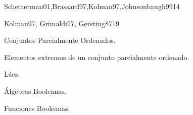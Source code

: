 \begin{syllabus}
\begin{unit}{\DSTHREEDef}{Scheinerman01,Brassard97,Kolman97,Johnsonbaugh99}{14}
\begin{topics}
      \item \DSTHREETopicNociones
      \item \DSTHREETopicEstructura
      \item \DSTHREETopicPruebas
      \item \DSTHREETopicPruebasy
      \item \DSTHREETopicPruebaspor
      \item \DSTHREETopicPruebasporcontradiccion
      \item \DSTHREETopicInduccion
      \item \DSTHREETopicInduccionfuerte
      \item \DSTHREETopicDefiniciones
      \item \DSTHREETopicEl
   \end{topics}

   \begin{unitgoals}
      \item \DSTHREEObjONE
      \item \DSTHREEObjTWO
      \item \DSTHREEObjTHREE
      \item \DSTHREEObjFOUR
   \end{unitgoals}
\end{unit}

\begin{unit}{\ARONEDef}{Kolman97, Grimaldi97, Gersting87}{19}
\begin{topics}
      \item Conjuntos Parcialmente Ordenados.
      \item Elementos extremos de un conjunto parcialmente ordenado.
      \item Láes.
      \item Álgebras Booleanas.
      \item Funciones Booleanas.
      \item \ARONETopicExpresiones
      \item \ARONETopicBloques
   \end{topics}
   \begin{unitgoals}
      \item \DSTHREEObjONE
      \item \DSTHREEObjTWO
      \item \DSTHREEObjTHREE
   \end{unitgoals}
\end{unit}


\end{syllabus}
